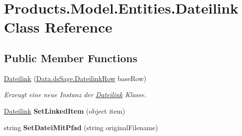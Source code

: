 \hypertarget{class_products_1_1_model_1_1_entities_1_1_dateilink}{}\section{Products.\+Model.\+Entities.\+Dateilink Class Reference}
\label{class_products_1_1_model_1_1_entities_1_1_dateilink}
\subsection*{Public Member Functions}
\begin{DoxyCompactItemize}
\item 
\hyperlink{class_products_1_1_model_1_1_entities_1_1_dateilink_ae2ad7f6a5f36036bd75aaf2ac71bde1a}{Dateilink} (\hyperlink{class_products_1_1_data_1_1ds_sage_1_1_dateilink_row}{Data.\+ds\+Sage.\+Dateilink\+Row} base\+Row)
\begin{DoxyCompactList}\small\item\em Erzeugt eine neue Instanz der \hyperlink{class_products_1_1_model_1_1_entities_1_1_dateilink}{Dateilink} Klasse. \end{DoxyCompactList}\item 
\hyperlink{class_products_1_1_model_1_1_entities_1_1_dateilink}{Dateilink} {\bfseries Set\+Linked\+Item} (object item)\hypertarget{class_products_1_1_model_1_1_entities_1_1_dateilink_ad71de554ba25295f55d2c801288c4896}{}\label{class_products_1_1_model_1_1_entities_1_1_dateilink_ad71de554ba25295f55d2c801288c4896}

\item 
string {\bfseries Set\+Datei\+Mit\+Pfad} (string original\+Filename)\hypertarget{class_products_1_1_model_1_1_entities_1_1_dateilink_a5631f1223ccfb537d38ad0524e5ac3e1}{}\label{class_products_1_1_model_1_1_entities_1_1_dateilink_a5631f1223ccfb537d38ad0524e5ac3e1}

\end{DoxyCompactItemize}

